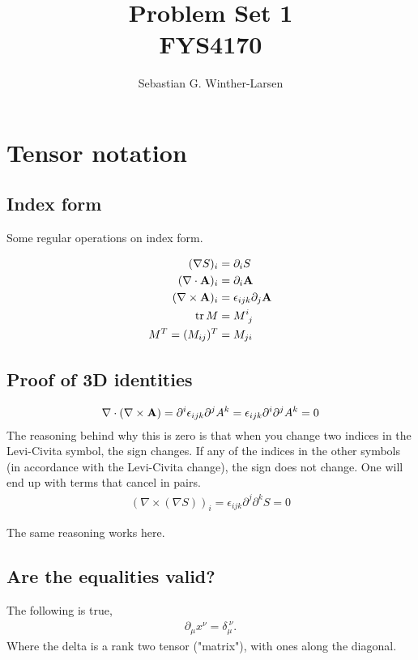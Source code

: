 \documentclass[]{amsart}
\title{Problem Set 1 \\ \small{FYS4170}}
\author{Sebastian G. Winther-Larsen}
\begin{document}
\maketitle

\section{Tensor notation}

\subsection{Index form}
Some regular operations on index form.

\begin{align*}
(\nabla S)_i  &= \partial_i S \\
(\nabla\cdot \vb{A})_i &= \partial_i \vb{A} \\
(\nabla \times \vb{A})_i &= \epsilon_{ijk} \partial_j \vb{A} \\
\trace{M} &= M^i_{\ j} \\
M^T = (M_{ij})^T &= M_{ji}
\end{align*}

\subsection{Proof of 3D identities}

\begin{align*}
\nabla\cdot(\nabla\times\vb{A}) = \partial^i \epsilon_{ijk}\partial^j A^k = \epsilon_{ijk} \partial^i \partial^j A^k = 0
\end{align*}
The reasoning behind why this is zero is that when you change two indices in the Levi-Civita symbol, the sign changes. If any of the indices in the other symbols (in accordance with the Levi-Civita change), the sign does not change. One will end up with terms that cancel in pairs.
\begin{align*}
(\nabla\times(\nabla S))_i = \epsilon_{ijk} \partial^j \partial^k S = 0
\end{align*}

The same reasoning works here.

\subsection{Are the equalities valid?}
The following is true,
\begin{align*}
\partial_\mu x^\nu = \delta_\mu^{\ \nu}. 
\end{align*}
Where the delta is a rank two  tensor ("matrix"), with ones along the diagonal.
\end{document}
